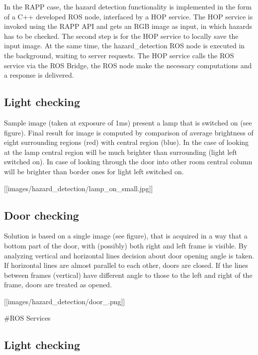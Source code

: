 In the R\-A\-P\-P case, the hazard detection functionality is implemented in the form of a C++ developed R\-O\-S node, interfaced by a H\-O\-P service. The H\-O\-P service is invoked using the R\-A\-P\-P A\-P\-I and gets an R\-G\-B image as input, in which hazards has to be checked. The second step is for the H\-O\-P service to locally save the input image. At the same time, the hazard\-\_\-detection R\-O\-S node is executed in the background, waiting to server requests. The H\-O\-P service calls the R\-O\-S service via the R\-O\-S Bridge, the R\-O\-S node make the necessary computations and a response is delivered.

\subsection*{Light checking}

Sample image (taken at exposure of 1ms) present a lamp that is switched on (see figure). Final result for image is computed by comparison of average brightness of eight surrounding regions (red) with central region (blue). In the case of looking at the lamp central region will be much brighter than surrounding (light left switched on). In case of looking through the door into other room central column will be brighter than border ones for light left switched on.

\mbox{[}\mbox{[}images/hazard\-\_\-detection/lamp\-\_\-on\-\_\-small.\-jpg\mbox{]}\mbox{]}

\subsection*{Door checking}

Solution is based on a single image (see figure), that is acquired in a way that a bottom part of the door, with (possibly) both right and left frame is visible. By analyzing vertical and horizontal lines decision about door opening angle is taken. If horizontal lines are almost parallel to each other, doors are closed. If the lines between frames (vertical) have different angle to those to the left and right of the frame, doors are treated as opened.

\mbox{[}\mbox{[}images/hazard\-\_\-detection/door\-\_.\-png\mbox{]}\mbox{]}

\#\-R\-O\-S Services

\subsection*{Light checking}

